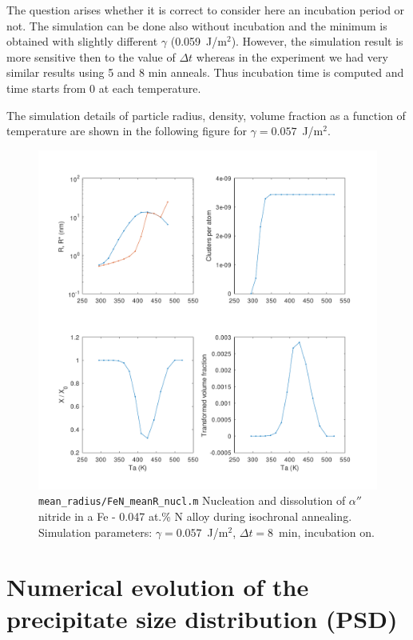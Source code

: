 \documentclass[12pt,a4paper]{article}
\begin{document}
\pagebreak
\FloatBarrier

The question arises whether it is correct to consider here an incubation period or not. The simulation can be done also without incubation and the minimum is obtained with slightly different $\gamma$ (0.059~J/m$^2$). However, the simulation result is more sensitive then to the value of $\Delta t$ whereas in the experiment we had very similar results using 5 and 8 min anneals. Thus incubation time is computed and time starts from 0 at each temperature.

The simulation details of particle radius, density, volume fraction as a function of temperature are shown in the following figure for $\gamma = 0.057$~J/m$^2$.

\begin{figure}[h]
\centering
\includegraphics[width=14cm]{../mean_radius/FeN_meanR_anneal} 
\caption{\texttt{mean\_radius/FeN\_meanR\_nucl.m} Nucleation and dissolution of $\alpha ''$ nitride in a Fe - 0.047 at.\% N alloy during isochronal annealing. Simulation parameters: $\gamma = 0.057$~J/m$^2$, $\Delta t = 8$~min, incubation on. }
\end{figure}

\pagebreak
\FloatBarrier

\section{Numerical evolution of the precipitate size distribution (PSD)}
\end{document}

